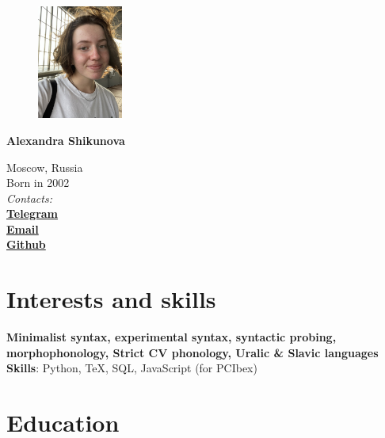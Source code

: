 \documentclass[11pt]{article} %
\begin{document}

\begin{figure} %
    \centering
    \includegraphics[width=0.25\textwidth]{photo}
\end{figure}
{\LARGE\bfseries Alexandra Shikunova} %
\bigskip\bigskip\medskip %

Moscow, Russia\\
Born in 2002\\

\textit{Contacts:}\\
\textbf{\href{https://t.me/thnlgrlivrlvdwsbrnwthrssnhrys}{Telegram}}\\
\textbf{\href{mailto:notalexandrashikunova@gmail.com}{Email}}\\
\textbf{\href{https://github.com/poisongrapevine}{Github}}
\medskip %


\section*{Interests and skills}

\textbf{Minimalist syntax, experimental syntax, syntactic probing, morphophonology, Strict CV phonology, Uralic \& Slavic languages}\\
\textbf{Skills}: Python, TeX, SQL, JavaScript (for PCIbex)


\section*{Education}
\end{document}
